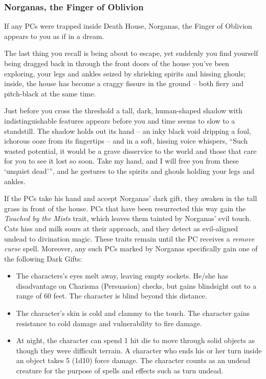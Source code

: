 \subsubsection*{Norganas, the Finger of Oblivion}
If any PCs were trapped inside Death House, Norganas, the Finger of Oblivion appears to you as if in a dream.
\begin{readout}
  The last thing you recall is being about to escape, yet suddenly you find yourself being dragged back in 
  through the front doors of the house you've been exploring, your legs and ankles seized by shrieking spirits 
  and hissing ghouls; inside, the house has become a craggy fissure in the ground -- both fiery and pitch-black 
  at the same time.
  
  Just before you cross the threshold a tall, dark, human-shaped shadow with indistinguishable features appears 
  before you and time seems to slow to a standstill. The shadow holds out its hand -- an inky black void dripping 
  a foul, ichorous ooze from its fingertips -- and in a soft, hissing voice whispers, ``Such wasted potential, it 
  would be a grave disservice to the world and those that care for you to see it lost so soon. Take my hand, and 
  I will free you from these `unquiet dead'{}'', and he gestures to the spirits and ghouls holding your legs and 
  ankles.
\end{readout}
If the PCs take his hand and accept Norganas' dark gift, they awaken in the tall grass in front of the house. PCs
that have been resurrected this way gain the \textit{Touched by the Mists} trait, which leaves them tainted by
Norganas' evil touch. Cats hiss and milk sours at their approach, and they detect as evil-aligned undead to
divination magic. These traits remain until the PC receives a \textit{remove curse} spell. Moreover, any such PCs
marked by Norganas specifically gain one of the following Dark Gifts:
\begin{itemize}
  \item The characters's eyes melt away, leaving empty sockets. He/she has disadvantage on Charisma (Persuasion) 
  checks, but gains blindsight out to a range of 60 feet. The character is blind beyond this distance.
  \item The character's skin is cold and clammy to the touch. The character gains resistance to cold damage and
  vulnerability to fire damage.
  \item At night, the character can spend 1 hit die to move through solid objects as though they were difficult
  terrain. A character who ends his or her turn inside an object takes 5 (1d10) force damage. The character
  counts as an undead creature for the purpose of spells and effects such as turn undead.
\end{itemize}

